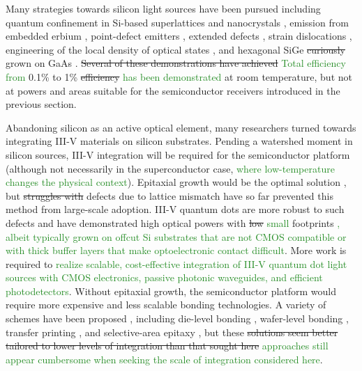 \documentclass[twocolumn]{article}
\begin{document}
Many strategies towards silicon light sources have been pursued \cite{iyxi1993,shxu2007} including quantum confinement in Si-based superlattices \cite{wali2008} and nanocrystals \cite{wabo2005}, emission from embedded erbium \cite{enpo1985,paga1996}, point-defect emitters \cite{brha1986,brbr1989,rosh2007b,bata2007}, extended defects \cite{nglo2001,milo2006}, strain dislocations \cite{kvba2004}, engineering of the local density of optical states \cite{grzh2001}, and hexagonal SiGe \sout{curiously} grown on GaAs \cite{Fadaly2020}. \sout{Several of these demonstrations have achieved} \textcolor{ForestGreen}{Total efficiency from} 0.1\% \cite{kvba2004} to 1\% \cite{grzh2001} \sout{efficiency} \textcolor{ForestGreen}{has been demonstrated} at room temperature, but not at powers and areas suitable for the semiconductor receivers introduced in the previous section.

Abandoning silicon as an active optical element, many researchers turned towards integrating III-V materials on silicon substrates. Pending a watershed moment in silicon sources, III-V integration will be required for the semiconductor platform (although not necessarily in the superconductor case, \textcolor{ForestGreen}{where low-temperature changes the physical context}). Epitaxial growth would be the optimal solution \cite{norman2018perspective}, but \sout{struggles with} defects due to lattice mismatch have so far prevented this method from large-scale adoption. III-V quantum dots are more robust to such defects and have demonstrated high optical powers with \sout{low} \textcolor{ForestGreen}{small} footprints \cite{chli2016,jung2017high, norman2018perspective}\textcolor{ForestGreen}{, albeit typically grown on offcut Si substrates that are not CMOS compatible or with thick buffer layers that make optoelectronic contact difficult}. More work is required to \textcolor{ForestGreen}{realize scalable, cost-effective integration of III-V quantum dot light sources with CMOS electronics, passive photonic waveguides, and efficient photodetectors}. Without epitaxial growth, the semiconductor platform would require more expensive and less scalable bonding technologies. A variety of schemes have been proposed \cite{norman2018perspective,tapa2019}, including die-level bonding \cite{sost2016,crsa2017}, wafer-level bonding \cite{huli2019,szha2019,jito2020}, transfer printing \cite{jubo2012,zhha2018,zhang2019iii}, and selective-area epitaxy \cite{haxu2021}, but these \sout{solutions seem better tailored to lower levels of integration than that sought here} \textcolor{ForestGreen}{approaches still appear cumbersome when seeking the scale of integration considered here}.
\end{document}
